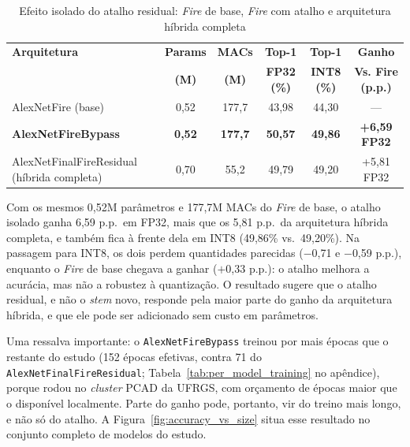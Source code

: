 \documentclass[conference]{IEEEtran}
\begin{document}
\begin{table}[!t]
\caption{Efeito isolado do atalho residual: \textit{Fire} de base, \textit{Fire} com atalho e
arquitetura híbrida completa}
\label{tab:bypass_ablation}
\centering
\begin{tabular}{@{}lccccc@{}}
\toprule
\textbf{Arquitetura} & \textbf{Params} & \textbf{MACs} & \textbf{Top-1} & \textbf{Top-1} & \textbf{Ganho} \\
 & \textbf{(M)} & \textbf{(M)} & \textbf{FP32 (\%)} & \textbf{INT8 (\%)} & \textbf{Vs. Fire (p.p.)} \\
\midrule
AlexNetFire (base) & 0,52 & 177,7 & 43,98 & 44,30 & — \\
\textbf{AlexNetFireBypass} & \textbf{0,52} & \textbf{177,7} & \textbf{50,57} & \textbf{49,86} & \textbf{+6,59 FP32} \\
AlexNetFinalFireResidual (híbrida completa) & 0,70 & 55,2 & 49,79 & 49,20 & +5,81 FP32 \\
\bottomrule
\end{tabular}
\end{table}

Com os mesmos 0,52M parâmetros e 177,7M MACs do \textit{Fire} de base, o atalho isolado ganha
6,59 p.p.\ em FP32, mais que os 5,81 p.p.\ da arquitetura híbrida completa, e também fica à frente
dela em INT8 (49,86\% vs.\ 49,20\%). Na passagem para INT8, os dois perdem quantidades parecidas
($-$0,71 e $-$0,59 p.p.), enquanto o \textit{Fire} de base chegava a ganhar ($+$0,33 p.p.): o
atalho melhora a acurácia, mas não a robustez à quantização. O resultado sugere que o atalho
residual, e não o \textit{stem} novo, responde pela maior parte do ganho da arquitetura híbrida, e
que ele pode ser adicionado sem custo em parâmetros.

Uma ressalva importante: o \texttt{AlexNetFireBypass} treinou por mais épocas que o restante do
estudo (152 épocas efetivas, contra 71 do \texttt{AlexNetFinalFireResidual};
Tabela~\ref{tab:per_model_training} no apêndice), porque rodou no \textit{cluster} PCAD da UFRGS,
com orçamento de épocas maior que o disponível localmente. Parte do ganho pode, portanto, vir do
treino mais longo, e não só do atalho. A Figura~\ref{fig:accuracy_vs_size} situa esse resultado no
conjunto completo de modelos do estudo.
\end{document}
